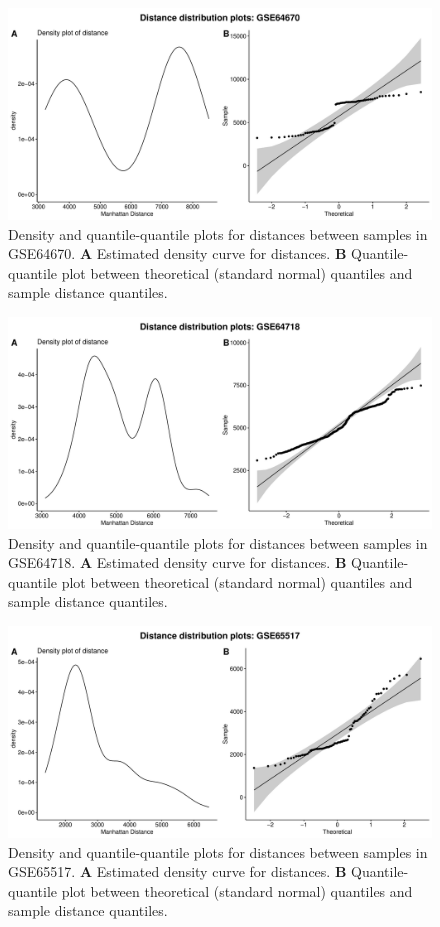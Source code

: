 \documentclass[10pt,letterpaper]{article}\usepackage[]{graphicx}\usepackage[]{color}
\begin{document}
\begin{figure}[H]
	\includegraphics[width=\textwidth]{manhattan-distance_hist_GSE64670.pdf}
	\caption{Density and quantile-quantile plots for distances between samples in GSE64670. \textbf{A} Estimated density curve for distances. \textbf{B} Quantile-quantile plot between theoretical (standard normal) quantiles and sample distance quantiles.}
\end{figure}

\begin{figure}[H]
	\includegraphics[width=\textwidth]{manhattan-distance_hist_GSE64718.pdf}
	\caption{Density and quantile-quantile plots for distances between samples in GSE64718. \textbf{A} Estimated density curve for distances. \textbf{B} Quantile-quantile plot between theoretical (standard normal) quantiles and sample distance quantiles.}
\end{figure}

\begin{figure}[H]
	\includegraphics[width=\textwidth]{manhattan-distance_hist_GSE65517.pdf}
	\caption{Density and quantile-quantile plots for distances between samples in GSE65517. \textbf{A} Estimated density curve for distances. \textbf{B} Quantile-quantile plot between theoretical (standard normal) quantiles and sample distance quantiles.}
\end{figure}
\end{document}

